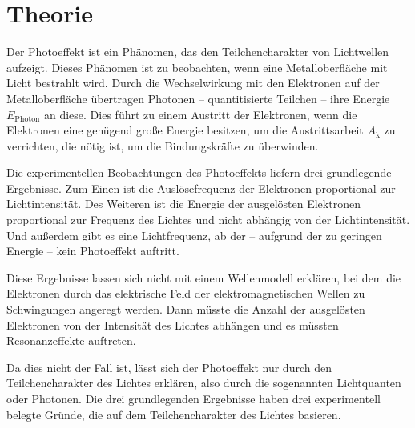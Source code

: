 \section{Theorie}
\label{sec:Theorie}

Der Photoeffekt ist ein Phänomen, das den Teilchencharakter von Lichtwellen aufzeigt.
Dieses Phänomen ist zu beobachten, wenn eine Metalloberfläche mit Licht bestrahlt wird.
Durch die Wechselwirkung mit den Elektronen auf der Metalloberfläche übertragen  Photonen --
quantitisierte Teilchen -- ihre Energie $E_{\mathrm{Photon}}$ an diese.
Dies führt zu einem Austritt der Elektronen, wenn die Elektronen eine genügend große Energie
besitzen, um die Austrittsarbeit $A_{\mathrm{k}}$ zu verrichten, die nötig ist, um die
Bindungskräfte zu überwinden.

Die experimentellen Beobachtungen des Photoeffekts liefern drei grundlegende Ergebnisse.
Zum Einen ist die Auslösefrequenz der Elektronen proportional zur Lichtintensität.
Des Weiteren ist die Energie der ausgelösten Elektronen proportional zur Frequenz des Lichtes
und nicht abhängig von der Lichtintensität.
Und außerdem gibt es eine Lichtfrequenz, ab der -- aufgrund der zu geringen Energie -- kein
Photoeffekt auftritt.

Diese Ergebnisse lassen sich nicht mit einem Wellenmodell erklären, bei dem die Elektronen
durch das elektrische Feld der elektromagnetischen Wellen zu Schwingungen  angeregt werden.
Dann müsste die Anzahl der ausgelösten Elektronen von der Intensität des Lichtes abhängen
und es müssten Resonanzeffekte auftreten.

Da dies nicht der Fall ist, lässt sich der Photoeffekt nur durch den Teilchencharakter des
Lichtes erklären, also durch die sogenannten Lichtquanten oder Photonen.
Die drei grundlegenden Ergebnisse haben drei experimentell belegte Gründe, die auf dem
Teilchencharakter des Lichtes basieren.

